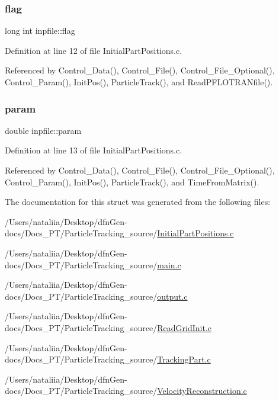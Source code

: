 \mbox{\label{structinpfile_a23ae60bf94767194de9a09a4eee8cc1d}} 
\subsubsection{\texorpdfstring{flag}{flag}}
{\footnotesize\ttfamily long int inpfile\+::flag}



Definition at line 12 of file Initial\+Part\+Positions.\+c.



Referenced by Control\+\_\+\+Data(), Control\+\_\+\+File(), Control\+\_\+\+File\+\_\+\+Optional(), Control\+\_\+\+Param(), Init\+Pos(), Particle\+Track(), and Read\+P\+F\+L\+O\+T\+R\+A\+Nfile().

\mbox{\label{structinpfile_a57ff2cce78c35a8a128927da9eeccfbc}} 
\subsubsection{\texorpdfstring{param}{param}}
{\footnotesize\ttfamily double inpfile\+::param}



Definition at line 13 of file Initial\+Part\+Positions.\+c.



Referenced by Control\+\_\+\+Data(), Control\+\_\+\+File(), Control\+\_\+\+File\+\_\+\+Optional(), Control\+\_\+\+Param(), Init\+Pos(), Particle\+Track(), and Time\+From\+Matrix().



The documentation for this struct was generated from the following files\+:\begin{DoxyCompactItemize}
\item 
/\+Users/nataliia/\+Desktop/dfn\+Gen-\/docs/\+Docs\+\_\+\+P\+T/\+Particle\+Tracking\+\_\+source/\mbox{\hyperlink{_initial_part_positions_8c}{Initial\+Part\+Positions.\+c}}\item 
/\+Users/nataliia/\+Desktop/dfn\+Gen-\/docs/\+Docs\+\_\+\+P\+T/\+Particle\+Tracking\+\_\+source/\mbox{\hyperlink{main_8c}{main.\+c}}\item 
/\+Users/nataliia/\+Desktop/dfn\+Gen-\/docs/\+Docs\+\_\+\+P\+T/\+Particle\+Tracking\+\_\+source/\mbox{\hyperlink{output_8c}{output.\+c}}\item 
/\+Users/nataliia/\+Desktop/dfn\+Gen-\/docs/\+Docs\+\_\+\+P\+T/\+Particle\+Tracking\+\_\+source/\mbox{\hyperlink{_read_grid_init_8c}{Read\+Grid\+Init.\+c}}\item 
/\+Users/nataliia/\+Desktop/dfn\+Gen-\/docs/\+Docs\+\_\+\+P\+T/\+Particle\+Tracking\+\_\+source/\mbox{\hyperlink{_tracking_part_8c}{Tracking\+Part.\+c}}\item 
/\+Users/nataliia/\+Desktop/dfn\+Gen-\/docs/\+Docs\+\_\+\+P\+T/\+Particle\+Tracking\+\_\+source/\mbox{\hyperlink{_velocity_reconstruction_8c}{Velocity\+Reconstruction.\+c}}\end{DoxyCompactItemize}
